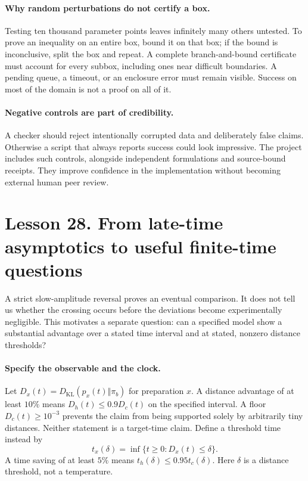 \paragraph{Why random perturbations do not certify a box.}
Testing ten thousand parameter points leaves infinitely many others
untested. To prove an inequality on an entire box, bound it on that box;
if the bound is inconclusive, split the box and repeat. A complete
branch-and-bound certificate must account for every subbox, including
ones near difficult boundaries. A pending queue, a timeout, or an enclosure
error must remain visible. Success on most of the domain is not a proof
on all of it.

\paragraph{Negative controls are part of credibility.}
A checker should reject intentionally corrupted data and deliberately
false claims. Otherwise a script that always reports success could look
impressive. The project includes such controls, alongside independent
formulations and source-bound receipts. They improve confidence in the
implementation without becoming external human peer review.

\clearpage
\section*{Lesson 28. From late-time asymptotics to useful finite-time questions}
A strict slow-amplitude reversal proves an eventual comparison. It does
not tell us whether the crossing occurs before the deviations become
experimentally negligible. This motivates a separate question: can a
specified model show a substantial advantage over a stated time interval
and at stated, nonzero distance thresholds?

\paragraph{Specify the observable and the clock.}
Let $D_x(t)=D_{\mathrm{KL}}(p_x(t)\Vert\pi_b)$ for preparation $x$.
A distance advantage of at least $10\%$ means
$D_h(t)\leq0.9D_c(t)$ on the specified interval. A floor
$D_c(t)\geq10^{-3}$ prevents the claim from being supported solely by
arbitrarily tiny distances. Neither statement is a target-time claim.
Define a threshold time instead by
\[
t_x(\delta)=\inf\{t\geq0:D_x(t)\leq\delta\}.
\]
A time saving of at least $5\%$ means $t_h(\delta)\leq0.95t_c(\delta)$.
Here $\delta$ is a distance threshold, not a temperature.

